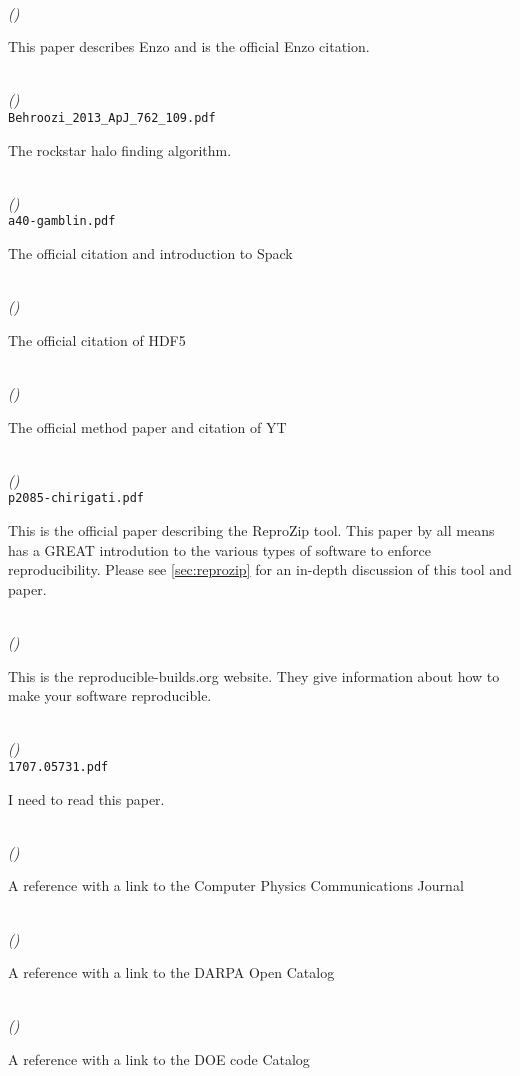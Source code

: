 \documentclass[american]{article}
\newenvironment{refdef}[2] {
	\noindent \textbf{\citetitle{#1}} \cite{#1}\\ \citejournalorbooktitle{#1} \textit{(\citeyear{#1})}\\ \texttt{#2} \vspace{0.2in} \par 
} {
\vspace{0.2in}
}
\begin{document}
\begin{refdef}{Enzo}{}
This paper describes Enzo and is the official Enzo citation.
\end{refdef}

\begin{refdef}{rockstar}{Behroozi\_2013\_ApJ\_762\_109.pdf}
The rockstar halo finding algorithm.
\end{refdef}

\begin{refdef}{Spack}{a40-gamblin.pdf}
The official citation and introduction to Spack
\end{refdef}

\begin{refdef}{hdf5}{}
The official citation of HDF5
\end{refdef}

\begin{refdef}{yt}{}
The official method paper and citation of YT
\end{refdef}

\begin{refdef}{reprozip}{p2085-chirigati.pdf}
This is the official paper describing the ReproZip tool. This paper by all means has a GREAT introdution to the various types of software to enforce reproducibility. Please see \ref{sec:reprozip} for an in-depth discussion of this tool and paper.
\end{refdef}

\begin{refdef}{reproducible-builds}{}
This is the reproducible-builds.org website. They give information about how to make your software reproducible.
\end{refdef}

\begin{refdef}{sciunits}{1707.05731.pdf}
I need to read this paper.
\end{refdef}

\begin{refdef}{computer-physics-communications}{}
A reference with a link to the Computer Physics Communications Journal
\end{refdef}

\begin{refdef}{darpa-open-catalog}{}
A reference with a link to the DARPA Open Catalog
\end{refdef}

\begin{refdef}{doe-code}{}
A reference with a link to the DOE code Catalog
\end{refdef}
\end{document}
